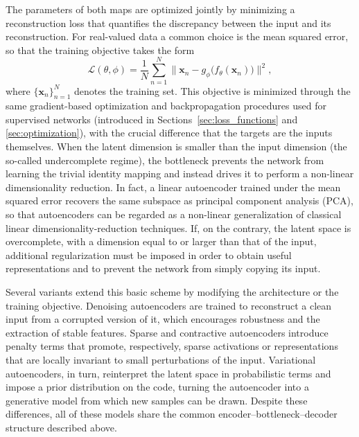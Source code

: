 The parameters of both maps are optimized jointly by minimizing a reconstruction loss that quantifies the discrepancy between the input and its reconstruction. For real-valued data a common choice is the mean squared error, so that the training objective takes the form
\begin{equation}
    \mathcal{L}(\theta,\phi) = \frac{1}{N}\sum_{n=1}^{N} \big\| \mathbf{x}_{n} - g_{\phi}\!\big(f_{\theta}(\mathbf{x}_{n})\big) \big\|^{2},
    \label{eq:ae-loss}
\end{equation}
where $\{\mathbf{x}_{n}\}_{n=1}^{N}$ denotes the training set. This objective is minimized through the same gradient-based optimization and backpropagation procedures used for supervised networks (introduced in Sections~\ref{sec:loss_functions} and \ref{sec:optimization}), with the crucial difference that the targets are the inputs themselves. When the latent dimension is smaller than the input dimension (the so-called undercomplete regime), the bottleneck prevents the network from learning the trivial identity mapping and instead drives it to perform a non-linear dimensionality reduction. In fact, a linear autoencoder trained under the mean squared error recovers the same subspace as principal component analysis (PCA), so that autoencoders can be regarded as a non-linear generalization of classical linear dimensionality-reduction techniques. If, on the contrary, the latent space is overcomplete, with a dimension equal to or larger than that of the input, additional regularization must be imposed in order to obtain useful representations and to prevent the network from simply copying its input.

Several variants extend this basic scheme by modifying the architecture or the training objective. Denoising autoencoders are trained to reconstruct a clean input from a corrupted version of it, which encourages robustness and the extraction of stable features. Sparse and contractive autoencoders introduce penalty terms that promote, respectively, sparse activations or representations that are locally invariant to small perturbations of the input. Variational autoencoders, in turn, reinterpret the latent space in probabilistic terms and impose a prior distribution on the code, turning the autoencoder into a generative model from which new samples can be drawn. Despite these differences, all of these models share the common encoder--bottleneck--decoder structure described above.

